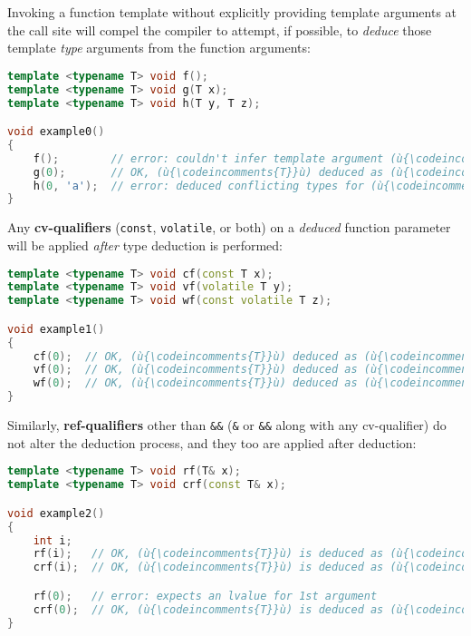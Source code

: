 Invoking a function template without explicitly providing template
arguments at the call site will compel the compiler to attempt, if
possible, to \emph{deduce} those template \emph{type} arguments from the
function arguments:

\begin{lstlisting}[language=C++]
template <typename T> void f();
template <typename T> void g(T x);
template <typename T> void h(T y, T z);

void example0()
{
    f();        // error: couldn't infer template argument (ù{\codeincomments{T}}ù)
    g(0);       // OK, (ù{\codeincomments{T}}ù) deduced as (ù{\codeincomments{int}}ù) from literal (ù{\codeincomments{0}}ù) -- (ù{\codeincomments{x}}ù) is an (ù{\codeincomments{int}}ù).
    h(0, 'a');  // error: deduced conflicting types for (ù{\codeincomments{T}}ù) ((ù{\codeincomments{int}}ù) vs. (ù{\codeincomments{char}}ù))
}
\end{lstlisting}
    
\noindent Any \textbf{cv-qualifiers} (\texttt{const}, \texttt{volatile}, or both)
on a \emph{deduced} function parameter will be applied \emph{after} type
deduction is performed:

\begin{lstlisting}[language=C++]
template <typename T> void cf(const T x);
template <typename T> void vf(volatile T y);
template <typename T> void wf(const volatile T z);

void example1()
{
    cf(0);  // OK, (ù{\codeincomments{T}}ù) deduced as (ù{\codeincomments{int}}ù) -- (ù{\codeincomments{x}}ù) is a (ù{\codeincomments{const int}}ù).
    vf(0);  // OK, (ù{\codeincomments{T}}ù) deduced as (ù{\codeincomments{int}}ù) -- (ù{\codeincomments{y}}ù) is a (ù{\codeincomments{volatile int}}ù).
    wf(0);  // OK, (ù{\codeincomments{T}}ù) deduced as (ù{\codeincomments{int}}ù) -- (ù{\codeincomments{z}}ù) is a (ù{\codeincomments{const}}ù) (ù{\codeincomments{volatile}}ù) (ù{\codeincomments{int}}ù).
}
\end{lstlisting}
    
\noindent Similarly, \textbf{ref-qualifiers} other than \texttt{\&\&}
(\texttt{\&} or \texttt{\&\&} along with any cv-qualifier) do not
alter the deduction process, and they too are applied after deduction:

\begin{lstlisting}[language=C++]
template <typename T> void rf(T& x);
template <typename T> void crf(const T& x);

void example2()
{
    int i;
    rf(i);   // OK, (ù{\codeincomments{T}}ù) is deduced as (ù{\codeincomments{int}}ù) -- (ù{\codeincomments{x}}ù) is an (ù{\codeincomments{int\&}}ù).
    crf(i);  // OK, (ù{\codeincomments{T}}ù) is deduced as (ù{\codeincomments{int}}ù) -- (ù{\codeincomments{x}}ù) is a (ù{\codeincomments{const int\&}}ù).

    rf(0);   // error: expects an lvalue for 1st argument
    crf(0);  // OK, (ù{\codeincomments{T}}ù) is deduced as (ù{\codeincomments{int}}ù) -- (ù{\codeincomments{x}}ù) is a (ù{\codeincomments{const int\&}}ù).
}
\end{lstlisting}
    
